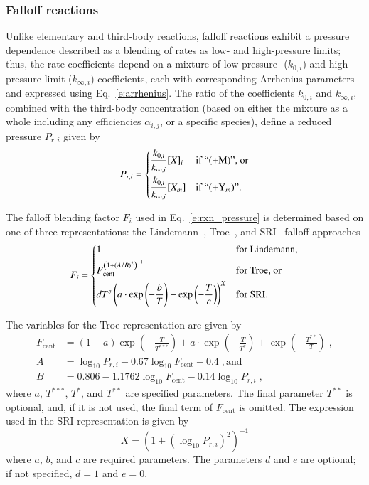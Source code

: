 \documentclass[preprint,12pt]{elsarticle}
\begin{document}
\subsubsection{Falloff reactions}

Unlike elementary and third-body reactions, falloff reactions exhibit a pressure dependence described as a blending of rates as low- and high-pressure limits; thus, the rate coefficients depend on a mixture of low-pressure- ($k_{0, i}$) and high-pressure-limit ($k_{\infty,i}$) coefficients, each with corresponding Arrhenius parameters and expressed using Eq.~\eqref{e:arrhenius}.
The ratio of the coefficients $k_{0, i}$ and $k_{\infty, i}$, combined with the third-body concentration (based on either the mixture as a whole including any efficiencies $\alpha_{i,j}$, or a specific species), define a reduced pressure $P_{r,i}$ given by
\begin{equation}
P_{r,i} = \begin{dcases}
\frac{k_{0,i}}{k_{\infty,i}} [X]_i &\text{if ``(+M)'', or} \\
\frac{k_{0,i}}{k_{\infty,i}} [X_m] &\text{if ``} (+\text{Y}_m\text{)''.}
\end{dcases}
\label{e:pr_i}
\end{equation}

The falloff blending factor $F_i$ used in Eq.~\eqref{e:rxn_pressure} is determined based on one of three representations: the Lindemann~\cite{Lindemann:1922cz}, Troe~\cite{Gilbert:1983bb}, and SRI~\cite{Stewart:1989gj} falloff approaches
\begin{equation}
F_i = \begin{dcases}
1 &\text{for Lindemann,} \\
F_{\text{cent}}^{ \left( 1 + ( A / B )^2 \right)^{-1} } &\text{for Troe, or} \\
d T^e \left( a \cdot \exp \left( -\frac{b}{T} \right) + \exp \left( -\frac{T}{c} \right) \right)^X &\text{for SRI.}
\end{dcases}
\end{equation}

The variables for the Troe representation are given by
\begin{align}
F_{\text{cent}} &= (1 - a) \exp \left( -\frac{T}{T^{***}} \right) + a\cdot \exp \left( -\frac{T}{T^*} \right) + \exp \left( -\frac{T^{**}}{T} \right) \;, \\
A &= \log_{10} P_{r,i} - 0.67 \log_{10} F_{\text{cent}} - 0.4 \;, \text{and} \\
B &= 0.806 - 1.1762 \log_{10} F_{\text{cent}} - 0.14 \log_{10} P_{r,i} \;,
\end{align}
where $a$, $T^{***}$, $T^*$, and $T^{**}$ are specified parameters.
The final parameter $T^{**}$ is optional, and, if it is not used, the final term of $F_{\text{cent}}$ is omitted.
The expression used in the SRI representation is given by
\begin{equation}
X = \left( 1 + \left( \log_{10} P_{r,i} \right)^2 \right)^{-1}
\end{equation}
where $a$, $b$, and $c$ are required parameters.
The parameters $d$ and $e$ are optional; if not specified, $d = 1$ and $e = 0$.
\end{document}

